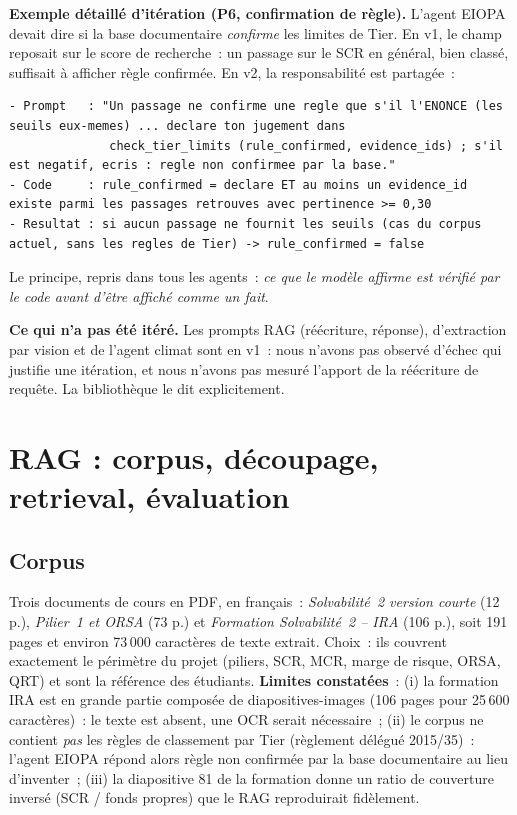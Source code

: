 \documentclass[11pt,a4paper]{article}
\begin{document}
\textbf{Exemple d\'etaill\'e d'it\'eration (P6, confirmation de r\`egle).} L'agent EIOPA devait dire si la base documentaire \emph{confirme} les limites de Tier. En v1, le champ reposait sur le score de recherche~: un passage sur le SCR en g\'en\'eral, bien class\'e, suffisait \`a afficher \og r\`egle confirm\'ee\fg. En v2, la responsabilit\'e est partag\'ee~:
\begin{lstlisting}
- Prompt   : "Un passage ne confirme une regle que s'il l'ENONCE (les seuils eux-memes) ... declare ton jugement dans
              check_tier_limits (rule_confirmed, evidence_ids) ; s'il est negatif, ecris : regle non confirmee par la base."
- Code     : rule_confirmed = declare ET au moins un evidence_id existe parmi les passages retrouves avec pertinence >= 0,30
- Resultat : si aucun passage ne fournit les seuils (cas du corpus actuel, sans les regles de Tier) -> rule_confirmed = false
\end{lstlisting}
Le principe, repris dans tous les agents~: \emph{ce que le mod\`ele affirme est v\'erifi\'e par le code avant d'\^etre affich\'e comme un fait}.

\textbf{Ce qui n'a pas \'et\'e it\'er\'e.} Les prompts RAG (r\'e\'ecriture, r\'eponse), d'extraction par vision et de l'agent climat sont en v1~: nous n'avons pas observ\'e d'\'echec qui justifie une it\'eration, et nous n'avons pas mesur\'e l'apport de la r\'e\'ecriture de requ\^ete. La biblioth\`eque le dit explicitement.

\section{RAG : corpus, d\'ecoupage, retrieval, \'evaluation}
\subsection{Corpus}
Trois documents de cours en PDF, en fran\c{c}ais~: \emph{Solvabilit\'e~2 version courte} (12 p.), \emph{Pilier~1 et ORSA} (73 p.) et \emph{Formation Solvabilit\'e~2 -- IRA} (106 p.), soit 191 pages et environ 73\,000 caract\`eres de texte extrait. Choix~: ils couvrent exactement le p\'erim\`etre du projet (piliers, SCR, MCR, marge de risque, ORSA, QRT) et sont la r\'ef\'erence des \'etudiants. \textbf{Limites constat\'ees}~: (i) la formation IRA est en grande partie compos\'ee de diapositives-images (106 pages pour 25\,600 caract\`eres)~: le texte est absent, une OCR serait n\'ecessaire~; (ii) le corpus ne contient \emph{pas} les r\`egles de classement par Tier (r\`eglement d\'el\'egu\'e 2015/35)~: l'agent EIOPA r\'epond alors \og r\`egle non confirm\'ee par la base documentaire\fg{} au lieu d'inventer~; (iii) la diapositive 81 de la formation donne un ratio de couverture invers\'e (SCR / fonds propres) que le RAG reproduirait fid\`element.
\end{document}
